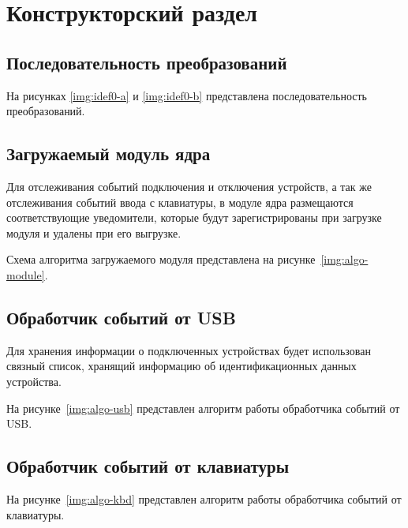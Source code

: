 \chapter{Конструкторский раздел}

\section{Последовательность преобразований}

На рисунках \ref{img:idef0-a} и \ref{img:idef0-b} представлена последовательность преобразований.



\section{Загружаемый модуль ядра}

Для отслеживания событий подключения и отключения устройств, а так же отслеживания событий ввода с клавиатуры, в модуле ядра размещаются соответствующие уведомители, которые будут зарегистрированы при загрузке модуля и удалены при его выгрузке.

Схема алгоритма загружаемого модуля представлена на рисунке~\ref{img:algo-module}.


\section{Обработчик событий от USB}

Для хранения информации о подключенных устройствах будет использован связный список, хранящий информацию об идентификационных данных устройства.

На рисунке~\ref{img:algo-usb} представлен алгоритм работы обработчика событий от USB.



\section{Обработчик событий от клавиатуры}

На рисунке~\ref{img:algo-kbd} представлен алгоритм работы обработчика событий от клавиатуры.

